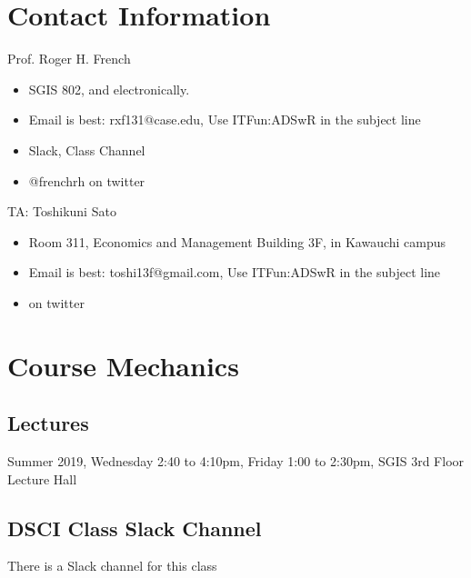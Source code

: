 \documentclass[11pt]{article} %
\begin{document}
\FloatBarrier

\section{Contact Information}
Prof. Roger H. French
\begin{itemize}
	\item SGIS 802, and electronically.
  \item Email is best: rxf131@case.edu, Use ITFun:ADSwR in the subject line
  \item Slack, Class Channel
  \item @frenchrh on twitter
\end{itemize}
TA: Toshikuni Sato
\begin{itemize}
	\item Room 311, Economics and Management Building 3F, in Kawauchi campus
	\item Email is best: toshi13f@gmail.com, Use ITFun:ADSwR in the subject line
	\item  on twitter
\end{itemize}

\section{Course Mechanics}

\subsection{Lectures}
Summer 2019, Wednesday 2:40 to 4:10pm, Friday 1:00 to 2:30pm, SGIS 3rd Floor Lecture Hall

\subsection{DSCI Class Slack Channel}

  There is a Slack channel for this class
  
\end{document}
